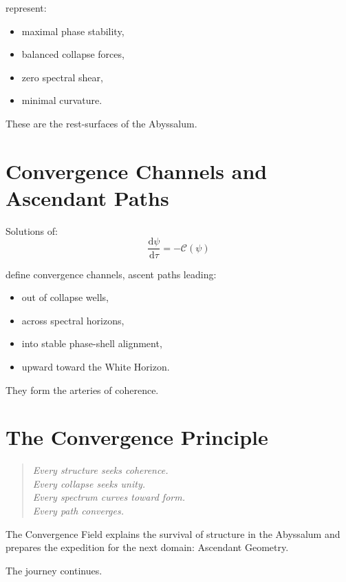 represent:
\begin{itemize}
  \item maximal phase stability,
  \item balanced collapse forces,
  \item zero spectral shear,
  \item minimal curvature.
\end{itemize}

These are the rest-surfaces of the Abyssalum.

\section{Convergence Channels and Ascendant Paths}
Solutions of:
\[
\frac{\mathrm{d}\psi}{\mathrm{d}\tau} = -\mathcal{C}(\psi)
\]

define convergence channels, ascent paths leading:
\begin{itemize}
  \item out of collapse wells,
  \item across spectral horizons,
  \item into stable phase-shell alignment,
  \item upward toward the White Horizon.
\end{itemize}

They form the arteries of coherence.

\section{The Convergence Principle}
\begin{quote}
\emph{
Every structure seeks coherence.\\
Every collapse seeks unity.\\
Every spectrum curves toward form.\\
Every path converges.
}
\end{quote}

The Convergence Field explains the survival of structure in the Abyssalum and prepares the
expedition for the next domain: Ascendant Geometry.

The journey continues.
